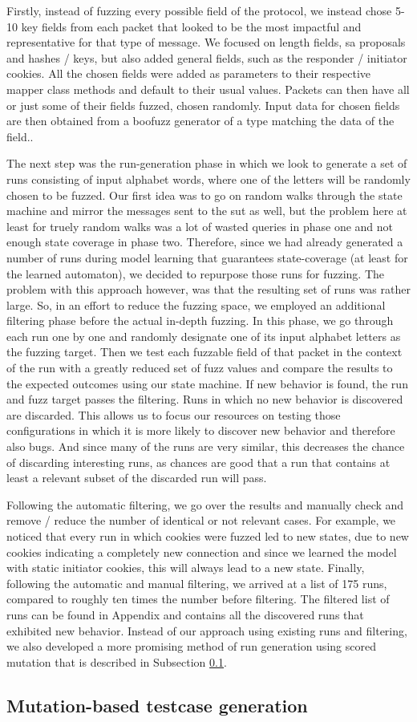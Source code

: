 Firstly, instead of fuzzing every possible field of the protocol, we instead chose 5-10 key fields from each packet that looked to be the most impactful and representative for that type of message. We focused on length fields, \ac{sa} proposals and hashes / keys, but also added general fields, such as the responder / initiator cookies. All the chosen fields were added as parameters to their respective mapper class methods and default to their usual values. Packets can then have all or just some of their fields fuzzed, chosen randomly. Input data for chosen fields are then obtained from a boofuzz generator of a type matching the data of the field..

The next step was the run-generation phase in which we look to generate a set of runs consisting of input alphabet words, where one of the letters will be randomly chosen to be fuzzed. Our first idea was to go on random walks through the state machine and mirror the messages sent to the \ac{sut} as well, but the problem here at least for truely random walks was a lot of wasted queries in phase one and not enough state coverage in phase two. Therefore, since we had already generated a number of runs during model learning that guarantees state-coverage (at least for the learned automaton), we decided to repurpose those runs for fuzzing. The problem with this approach however, was that the resulting set of runs was rather large. So, in an effort to reduce the fuzzing space, we employed an additional filtering phase before the actual in-depth fuzzing. In this phase, we go through each run one by one and randomly designate one of its input alphabet letters as the fuzzing target. Then we test each fuzzable field of that packet in the context of the run with a greatly reduced set of fuzz values and compare the results to the expected outcomes using our state machine. If new behavior is found, the run and fuzz target passes the filtering. Runs in which no new behavior is discovered are discarded. This allows us to focus our resources on testing those configurations in which it is more likely to discover new behavior and therefore also bugs. And since many of the runs are very similar, this decreases the chance of discarding interesting runs, as chances are good that a run that contains at least a relevant subset of the discarded run will pass.

Following the automatic filtering, we go over the results and manually check and remove / reduce the number of identical or not relevant cases. For example, we noticed that every run in which cookies were fuzzed led to new states, due to new cookies indicating a completely new connection and since we learned the model with static initiator cookies, this will always lead to a new state. 
Finally, following the automatic and manual filtering, we arrived at a list of 175 runs, compared to roughly ten times the number before filtering. The filtered list of runs can be found in Appendix  and contains all the discovered runs that exhibited new behavior. Instead of our approach using existing runs and filtering, we also developed a more promising method of run generation using scored mutation that is described in Subsection \ref{subsec:mutations}.


\subsection{Mutation-based testcase generation} \label{subsec:mutations}
